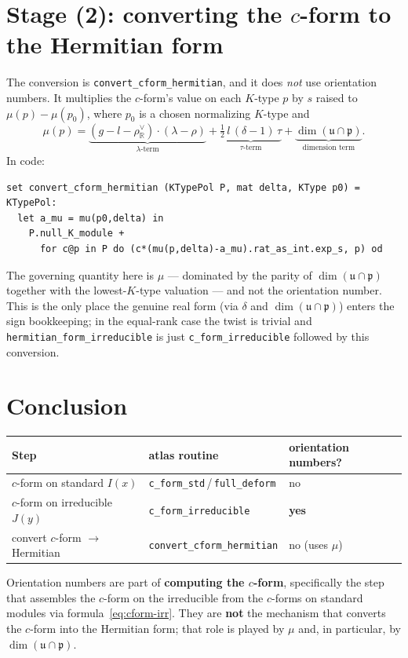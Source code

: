 \documentclass[11pt]{article}
\newcommand{\p}{\mathfrak{p}}
\newcommand{\uu}{\mathfrak{u}}
\DeclareMathOperator{\dimm}{dim}
\begin{document}
\section{Stage (2): converting the $c$-form to the Hermitian form}

The conversion is \texttt{convert\_cform\_hermitian}, and it does \emph{not} use
orientation numbers.  It multiplies the $c$-form's value on each $K$-type $p$ by
$s$ raised to $\mu(p)-\mu(p_0)$, where $p_0$ is a chosen normalizing $K$-type and
\begin{equation}
  \mu(p)= \underbrace{(g-l-\rho^\vee_{\mathbb R})\cdot(\lambda-\rho)}_{\text{$\lambda$-term}}
        + \underbrace{\tfrac12\,l\,(\delta-1)\,\tau}_{\text{$\tau$-term}}
        + \underbrace{\dimm(\uu\cap\p)}_{\text{dimension term}} .
\end{equation}
In code:
\begin{verbatim}
set convert_cform_hermitian (KTypePol P, mat delta, KType p0) = KTypePol:
  let a_mu = mu(p0,delta) in
    P.null_K_module +
      for c@p in P do (c*(mu(p,delta)-a_mu).rat_as_int.exp_s, p) od
\end{verbatim}
The governing quantity here is $\mu$ --- dominated by the parity of
$\dimm(\uu\cap\p)$ together with the lowest-$K$-type valuation --- and not the
orientation number.  This is the only place the genuine real form (via $\delta$
and $\dimm(\uu\cap\p)$) enters the sign bookkeeping; in the equal-rank case the
twist is trivial and \texttt{hermitian\_form\_irreducible} is just
\texttt{c\_form\_irreducible} followed by this conversion.

\section{Conclusion}

\begin{center}
\begin{tabular}{lll}
\hline
Step & atlas routine & orientation numbers?\\
\hline
$c$-form on standard $I(x)$           & \texttt{c\_form\_std}\,/\,\texttt{full\_deform} & no \\
$c$-form on irreducible $J(y)$        & \texttt{c\_form\_irreducible}                   & \textbf{yes} \\
convert $c$-form $\to$ Hermitian      & \texttt{convert\_cform\_hermitian}              & no (uses $\mu$)\\
\hline
\end{tabular}
\end{center}

\noindent
Orientation numbers are part of \textbf{computing the $c$-form}, specifically the
step that assembles the $c$-form on the irreducible from the $c$-forms on
standard modules via formula~\eqref{eq:cform-irr}.  They are \textbf{not} the
mechanism that converts the $c$-form into the Hermitian form; that role is played
by $\mu$ and, in particular, by $\dimm(\uu\cap\p)$.
\end{document}
